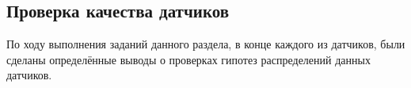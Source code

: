 \subsection*{Проверка качества датчиков}

По ходу выполнения заданий данного раздела, в конце каждого из датчиков, были сделаны определённые выводы о проверках гипотез распределений данных датчиков.